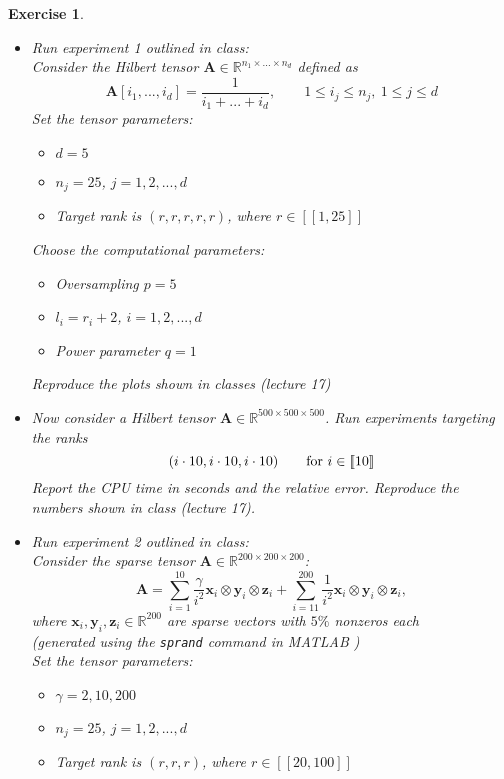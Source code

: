 \documentclass[11pt]{article}
\newcommand{\bvec}[1]{\mathbf{#1}}
\newcommand{\vx}{\bvec{x}}
\newcommand{\vy}{\bvec{y}}
\newcommand{\vz}{\bvec{z}}
\newcommand{\vA}{\bvec{A}}
\newtheorem{exercise}[theorem]{Exercise}
\begin{document}
\begin{exercise}
\begin{itemize}
      \item[vi)] Run experiment 1 outlined in class:\\
      Consider the Hilbert tensor $\vA\in\mathbb{R}^{n_1\times ... \times n_d}$ defined as
      $$
    \vA [i_1,...,i_d]
    =
\frac{1}{i_1+...+i_d},
\qquad 
1\leq i_j \leq n_j,~1\leq j \leq d
$$
Set the tensor parameters:\vspace{-3mm}
\begin{itemize}
\item[$\bullet$] $d = 5$  \vspace{-1.5mm}
\item[$\bullet$] $n_j = 25$, $j = 1, 2, . . . , d$ \vspace{-1.5mm}
\item[$\bullet$] Target rank is $(r, r, r, r, r)$, where $r \in [\![1, 25]\!]$\vspace{-2mm}
\end{itemize}
Choose the computational parameters:\vspace{-3mm}
\begin{itemize}
\item[$\bullet$] Oversampling $p = 5$  \vspace{-1.5mm}
\item[$\bullet$] $l_i = r_i+2$, $i= 1, 2, . . . , d$ \vspace{-1.5mm}
\item[$\bullet$] Power parameter $q=1$\vspace{-2mm}
\end{itemize}
Reproduce the plots shown in classes (lecture 17)
\item[vii)] Now consider a Hilbert tensor $\vA \in \mathbb{R}^{500 \times 500 \times  500}$. Run experiments targeting the ranks
$$
(i\cdot 10,i\cdot 10,i\cdot 10)\qquad  {\rm for }~ i\in [\![10]\!]
$$
Report the CPU time in seconds and the relative error. Reproduce the numbers shown in class (lecture 17).
\item[viii)] Run experiment 2 outlined in class:\\
Consider the sparse tensor $\vA\in\mathbb{R}^{200\times  200 \times 200}$:
$$
\vA 
=
\sum_{i=1}^{10}
\frac{\gamma}{i^2} \vx_i \otimes \vy_i \otimes \vz_i 
+
\sum_{i=11}^{200}
\frac{1}{i^2} \vx_i \otimes \vy_i \otimes \vz_i,
$$
where $ \vx_i ,\vy_i , \vz_i \in \mathbb{R}^{200}$ are sparse vectors with $5\%$ nonzeros each \\
(generated using the \texttt{sprand} command in MATLAB )\\
Set the tensor parameters:\vspace{-3mm}
\begin{itemize}
\item[$\bullet$] $\gamma = 2, 10, 200$ \vspace{-1.5mm}
\item[$\bullet$] $n_j = 25$, $j = 1, 2, . . . , d$ \vspace{-1.5mm}
\item[$\bullet$] Target rank is $(r, r, r)$, where $r \in [\![20, 100]\!]$\vspace{-2mm}
\end{itemize}


\end{itemize}
\end{exercise}
\end{document}
